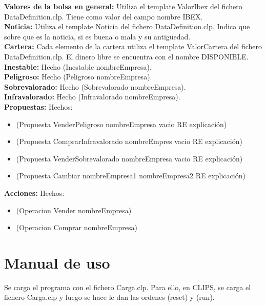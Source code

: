 \textbf{Valores de la bolsa en general:} Utiliza el template ValorIbex del fichero DataDefinition.clp. Tiene como valor del campo nombre IBEX.\\

\textbf{Noticia:} Utiliza el template Noticia del fichero DataDefinition.clp. Indica que sobre que es la noticia, si es buena o mala y su antigüedad.\\

\textbf{Cartera:} Cada elemento de la cartera utiliza el template ValorCartera del fichero DataDefinition.clp. El dinero libre se encuentra con el nombre DISPONIBLE.\\

\textbf{Inestable:} Hecho (Inestable nombreEmpresa).\\

\textbf{Peligroso:} Hecho (Peligroso nombreEmpresa).\\

\textbf{Sobrevalorado:} Hecho (Sobrevalorado nombreEmpresa).\\

\textbf{Infravalorado:} Hecho (Infravalorado nombreEmpresa).\\

\textbf{Propuestas:} Hechos:
\begin{itemize}
\item (Propuesta VenderPeligroso nombreEmpresa vacio RE explicación)
\item (Propuesta ComprarInfravalorado nombreEmpres vacio RE explicación)
\item (Propuesta VenderSobrevalorado nombreEmpresa vacio RE explicación)
\item (Propuesta Cambiar nombreEmpresa1 nombreEmpresa2 RE explicación)
\end{itemize}

\textbf{Acciones:} Hechos:
\begin{itemize}
\item (Operacion Vender nombreEmpresa)
\item (Operacion Comprar nombreEmpresa)
\end{itemize}
\newpage
\section{Manual de uso}

Se carga el programa con el fichero Carga.clp. Para ello, en CLIPS, se carga el fichero Carga.clp y luego se hace le dan las ordenes (reset) y (run).\\

